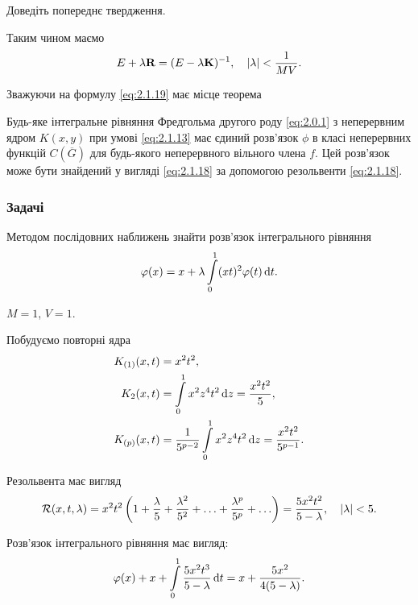 \begin{exercise}
	Доведіть попереднє твердження.
\end{exercise}

Таким чином маємо
\begin{equation}
	\label{eq:2.1.21}
	E + \lambda \bf{R} = (E - \lambda \bf{K})^{-1}, \quad |\lambda| < \dfrac{1}{MV}.
\end{equation}

Зважуючи на формулу \eqref{eq:2.1.19} має місце теорема
\begin{theorem}
	Будь-яке інтегральне рівняння Фредгольма другого роду \eqref{eq:2.0.1} з неперервним ядром $K(x, y)$ при умові \eqref{eq:2.1.13} має єдиний розв'язок $\phi$ в класі неперервних функцій $C\left(\overline G\right)$ для будь-якого неперервного вільного члена $f$. Цей розв'язок може бути знайдений у вигляді \eqref{eq:2.1.18} за допомогою резольвенти \eqref{eq:2.1.18}.
\end{theorem}

\subsubsection{Задачі}

\begin{example}
	Методом послідовних наближень знайти розв'язок інтегрального рівняння \[\phi(x) = x + \lambda \Int_0^1 (xt)^2 \phi(t) \diff t.\]
\end{example}

\begin{solution}
	$M = 1$, $V = 1$. \medskip

	Побудуємо повторні ядра 
	\begin{align*} 
		K_{(1)}(x, t) &= x^2t^2, \\
		K_2(x, t) &= \Int_0^1 x^2 z^4 t^2 \diff z = \dfrac{x^2t^2}{5}, \\ 
		K_{(p)}(x, t) &= \dfrac{1}{5^{p - 2}} \Int_0^1 x^2 z^4 t^2 \diff z = \dfrac{x^2t^2}{5^{p - 1}}.
	\end{align*}
	
	Резольвента має вигляд \[\cal{R}(x, t, \lambda) = x^2 t^2 \left(1 + \frac{\lambda}{5} + \frac{\lambda^2}{5^2} + \ldots + \frac{\lambda^p}{5^p} + \ldots \right) = \frac{5x^2t^2}{5 - \lambda}, \quad |\lambda| < 5. \]

	Розв'язок інтегрального рівняння має вигляд: \[ \phi(x) + x + \Int_0^1 \dfrac{5x^2t^3}{5 - \lambda} \diff t = x + \dfrac{5x^2}{4(5 - \lambda)}. \]
\end{solution}

